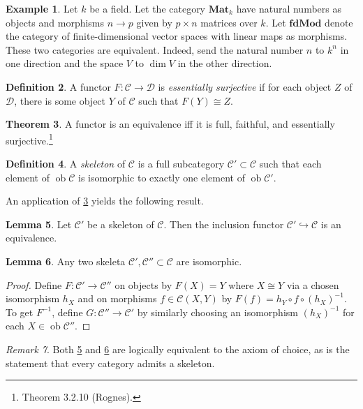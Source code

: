 \documentclass[10pt,letterpaper,cm]{nupset}
\theoremstyle{definition}
\newtheorem{definition}{Definition}[section]
\newtheorem{exmp}[definition]{Example}
\theoremstyle{theorem}
\newtheorem{theorem}[definition]{Theorem}
\newtheorem{lemma}[definition]{Lemma}
\theoremstyle{remark}
\newtheorem{remark}[definition]{Remark}
\newcommand{\1}{\mathbf{1}}
\renewcommand{\c}{\mathscr{C}}
\renewcommand{\d}{\mathscr{D}}
\newcommand{\0}{\vec 0}
\DeclareMathOperator{\ob}{ob}
\begin{document}
\begin{exmp}
Let $k$ be a field. Let the category $\mathbf{Mat}_k$  have natural numbers as objects and morphisms $n \to p$ given by $p \times n$ matrices over $k$. Let $\mathbf{fdMod}$ denote the category of finite-dimensional vector spaces with linear maps as morphisms. These two categories are equivalent. Indeed, send the natural number $n$ to $k^n$ in one direction and the space $V$ to $\dim V$ in the other direction.    
\end{exmp}


\begin{definition}
A functor $F : \c \to \d$ is \textit{essentially surjective} if for each object $Z$ of  $\d$, there is some object $Y$ of $\c$ such that $F(Y) \cong Z$.
\end{definition}

\begin{theorem}\label{equiv}
A functor is an equivalence iff it is full, faithful, and essentially surjective.\footnote{Theorem 3.2.10 (Rognes).}
\end{theorem}


\begin{definition}
A \textit{skeleton} of $\c$ is a full subcategory $\c' \subset \c$ such that each element of $\ob \c$ is isomorphic to exactly one element of $\ob \c'$.
\end{definition}

An application of \cref{equiv} yields the following result.

\begin{lemma}\label{e1}
Let $\c'$ be a skeleton of $\c$. Then the inclusion functor  $\c' \hookrightarrow \c$ is an equivalence.
\end{lemma}

\smallskip

\begin{lemma}\label{e2}
Any two skeleta $\c', \c'' \subset \c$ are isomorphic.
\end{lemma}
\begin{proof}
Define $F: \c' \to \c''$ on objects by $F(X) =Y$ where $X\cong Y$ via a chosen isomorphism $h_X$ and on morphisms $f\in \c(X, Y)$ by $F(f) = h_Y \circ f \circ (h_X)^{{-1}}$.
To get $F^{{-1}}$,  define $G: \c'' \to \c'$ by similarly choosing an isomorphism $\left(h_X\right)^{{-1}}$ for each $X\in \ob{\c''}$.
\end{proof}

\begin{remark}
Both \cref{e1} and \cref{e2} are logically equivalent to the axiom of choice, as is the statement that every category admits a skeleton.
\end{remark}
\end{document}
